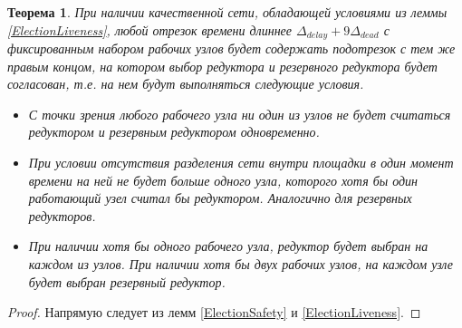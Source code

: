 \documentclass{article}
\theoremstyle{plain}
\newtheorem{theorem}{Теорема}[section]
\theoremstyle{plain}
\theoremstyle{plain}
\theoremstyle{plain}
\theoremstyle{definition}
\theoremstyle{remark}
\theoremstyle{plain}
\begin{document}
\begin{theorem}
\label{ElectionEC}
    При наличии качественной сети, обладающей условиями из леммы \ref{ElectionLiveness}, любой отрезок времени длиннее $\Delta_{delay} + 9\Delta_{dead}$ с фиксированным набором рабочих узлов будет содержать подотрезок с тем же правым концом, на котором выбор редуктора и резервного редуктора будет согласован, т.е. на нем будут выполняться следующие условия.
    
    \begin{itemize}
        \item С точки зрения любого рабочего узла ни один из узлов не будет считаться редуктором и резервным редуктором одновременно.
    
        \item При условии отсутствия разделения сети внутри площадки в один момент времени на ней не будет больше одного узла, которого хотя бы один работающий узел считал бы редуктором. Аналогично для резервных редукторов.
        
        \item При наличии хотя бы одного рабочего узла, редуктор будет выбран на каждом из узлов. При наличии хотя бы двух рабочих узлов, на каждом узле будет выбран резервный редуктор.
    \end{itemize}
\end{theorem}
\begin{proof}
    Напрямую следует из лемм \ref{ElectionSafety} и \ref{ElectionLiveness}.
\end{proof}
\end{document}
